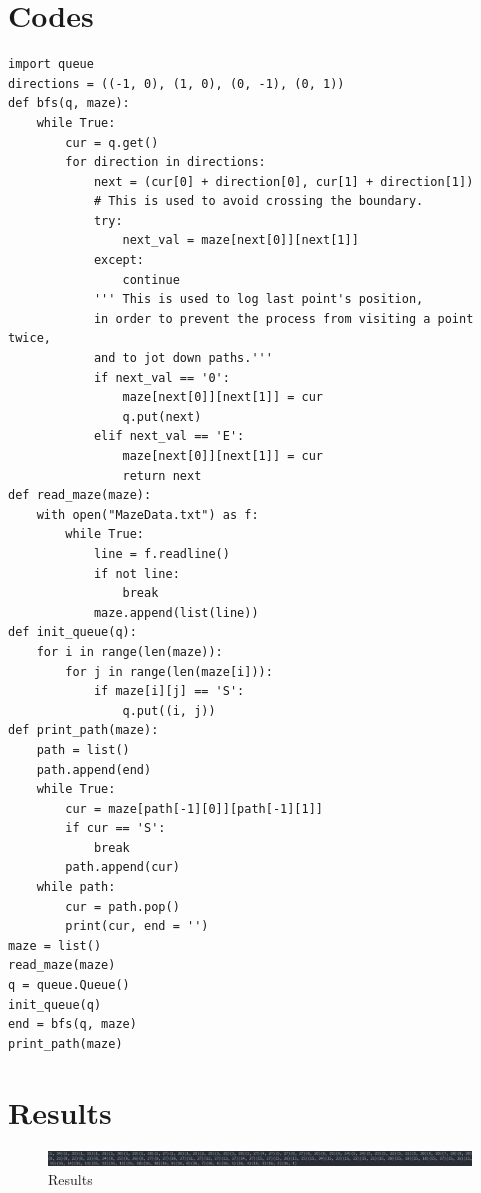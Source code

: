 \documentclass[a4paper, 11pt]{article}
\begin{document}
\section{Codes}
\lstset{language=Python, frame=single}
\begin{lstlisting}
import queue
directions = ((-1, 0), (1, 0), (0, -1), (0, 1))
def bfs(q, maze):
    while True:
        cur = q.get()
        for direction in directions:
            next = (cur[0] + direction[0], cur[1] + direction[1])
            # This is used to avoid crossing the boundary.
            try:
                next_val = maze[next[0]][next[1]]
            except:
                continue
            ''' This is used to log last point's position,
            in order to prevent the process from visiting a point twice,
            and to jot down paths.'''
            if next_val == '0':
                maze[next[0]][next[1]] = cur
                q.put(next)
            elif next_val == 'E':
                maze[next[0]][next[1]] = cur
                return next
def read_maze(maze):
    with open("MazeData.txt") as f:
        while True:
            line = f.readline()
            if not line:
                break
            maze.append(list(line))
def init_queue(q):
    for i in range(len(maze)):
        for j in range(len(maze[i])):
            if maze[i][j] == 'S':
                q.put((i, j))
def print_path(maze):
    path = list()
    path.append(end)
    while True:
        cur = maze[path[-1][0]][path[-1][1]]
        if cur == 'S':
            break
        path.append(cur)
    while path:
        cur = path.pop()
        print(cur, end = '')
maze = list()
read_maze(maze)
q = queue.Queue()
init_queue(q)
end = bfs(q, maze)
print_path(maze)
\end{lstlisting}

\section{Results}
\begin{figure}[ht]
\centering
\includegraphics[width=15cm]{result.png}
\caption{Results}
\end{figure}


%
%
\end{document}
